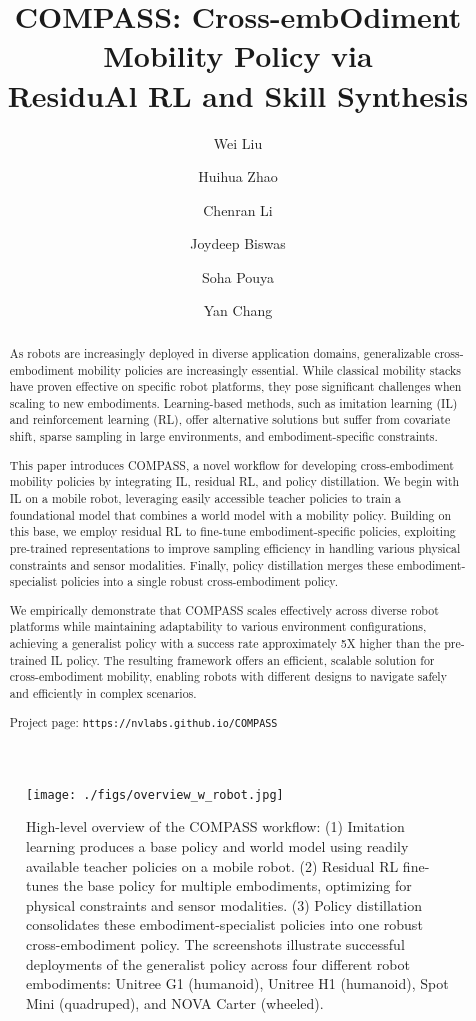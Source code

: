 \documentclass[letterpaper, 10 pt,conference]{ieeeconf}
\title{\textbf{COMPASS}: \textbf{C}ross-emb\textbf{O}diment \textbf{M}obility \textbf{P}olicy via \\
Residu\textbf{A}l RL and \textbf{S}kill \textbf{S}ynthesis}
\author[1]{Wei Liu}
\author[1]{Huihua Zhao}
\author[1,2]{Chenran Li}
\author[1,3]{Joydeep Biswas}
\author[1]{Soha Pouya}
\author[1]{Yan Chang}
\affil[ ]{$^1$Nvidia \quad $^2$UC Berkeley \quad $^3$UT Austin}
\begin{document}
\maketitle
\begin{abstract}
As robots are increasingly deployed in diverse application domains, generalizable cross-embodiment mobility policies are increasingly essential. While classical mobility stacks have proven effective on specific robot platforms, they pose significant challenges when scaling to new embodiments. Learning-based methods, such as imitation learning (IL) and reinforcement learning (RL), offer alternative solutions but suffer from covariate shift, sparse sampling in large environments, and embodiment-specific constraints.

This paper introduces COMPASS, a novel workflow for developing cross-embodiment mobility policies by integrating IL, residual RL, and policy distillation. We begin with IL on a mobile robot, leveraging easily accessible teacher policies to train a foundational model that combines a world model with a mobility policy. Building on this base, we employ residual RL to fine-tune embodiment-specific policies, exploiting pre-trained representations to improve sampling efficiency in handling various physical constraints and sensor modalities. Finally, policy distillation merges these embodiment-specialist policies into a single robust cross-embodiment policy.

We empirically demonstrate that COMPASS scales effectively across diverse robot platforms while maintaining adaptability to various environment configurations, achieving a generalist policy with a success rate approximately 5X higher than the pre-trained IL policy. The resulting framework offers an efficient, scalable solution for cross-embodiment mobility, enabling robots with different designs to navigate safely and efficiently in complex scenarios. 

Project page: \texttt{https://nvlabs.github.io/COMPASS}

\end{abstract}

\begin{figure*}[t]
\begin{center}
\centering\texttt{[image: ./figs/overview\_w\_robot.jpg]}
\caption{High-level overview of the COMPASS workflow: (1) Imitation learning produces a base policy and world model using readily available teacher policies on a mobile robot. (2) Residual RL fine-tunes the base policy for multiple embodiments, optimizing for physical constraints and sensor modalities. (3) Policy distillation consolidates these embodiment-specialist policies into one robust cross-embodiment policy. The screenshots illustrate successful deployments of the generalist policy across four different robot embodiments: Unitree G1 (humanoid), Unitree H1 (humanoid), Spot Mini (quadruped), and NOVA Carter (wheeled).}

\label{fig:overview}
\end{center}
\end{figure*}
\end{document}
